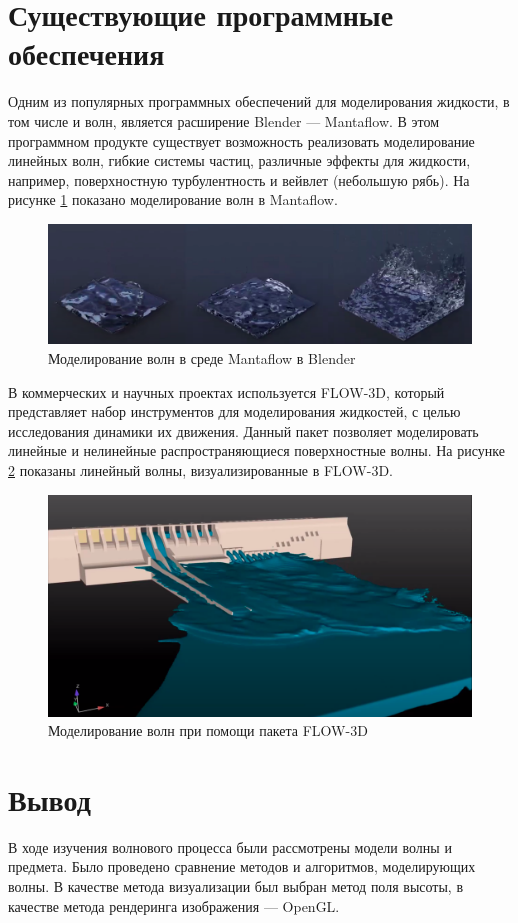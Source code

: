 \section{Существующие программные обеспечения}

Одним из популярных программных обеспечений для моделирования жидкости, в том числе и волн, является расширение Blender --- Mantaflow. В этом программном продукте существует возможность реализовать моделирование линейных волн, гибкие системы частиц, различные эффекты для жидкости, например, поверхностную турбулентность и вейвлет (небольшую рябь). На рисунке \ref{img:mantaflow} показано моделирование волн в Mantaflow. 

\begin{figure}[H]
	\begin{center}
		\includegraphics[scale=0.2]{img/mantaflow.png}
	\end{center}
	\captionsetup{justification=centering}
	\caption{Моделирование волн в среде Mantaflow в Blender}
	\label{img:mantaflow}
\end{figure}

В коммерческих и научных проектах используется FLOW-3D, который представляет набор инструментов для моделирования жидкостей, с целью исследования динамики их движения. Данный пакет позволяет моделировать линейные и нелинейные распространяющиеся поверхностные волны. На рисунке \ref{img:flow-3d} показаны линейный волны, визуализированные в FLOW-3D.

\begin{figure}[H]
	\begin{center}
		\includegraphics[scale=0.2]{img/flow-3d.png}
	\end{center}
	\captionsetup{justification=centering}
	\caption{Моделирование волн при помощи пакета FLOW-3D}
	\label{img:flow-3d}
\end{figure}

\section*{Вывод}

В ходе изучения волнового процесса были рассмотрены модели волны и предмета. Было проведено сравнение методов и алгоритмов, моделирующих волны. В качестве метода визуализации был выбран метод поля высоты, в качестве метода рендеринга изображения --- OpenGL.